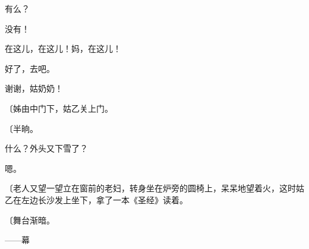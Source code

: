 有么？

没有！

在这儿，在这儿！妈，在这儿！

好了，去吧。

谢谢，姑奶奶！

{\fangsong〔姊由中门下，姑乙关上门。}

{\fangsong〔半晌。}

什么？外头又下雪了？

嗯。

{\fangsong〔老人又望一望立在窗前的老妇，转身坐在炉旁的圆椅上，呆呆地望着火，这时姑乙在左边长沙发上坐下，拿了一本《圣经》读着。}

{\fangsong〔舞台渐暗。}

\centerline{——幕}